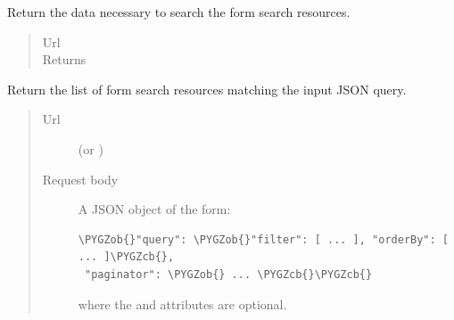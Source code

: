 \documentclass[letterpaper,10pt,english]{sphinxmanual}
\def\PYGZob{\char`\{}
\def\PYGZcb{\char`\}}
\begin{document}
\begin{fulllineitems}
\begin{fulllineitems}
\end{fulllineitems}


\begin{fulllineitems}
\label{api:onlinelinguisticdatabase.controllers.formsearches.FormsearchesController.new_search}
Return the data necessary to search the form search resources.
\begin{quote}\begin{description}
\item[{Url }] \leavevmode
{}

\item[{Returns}] \leavevmode
{}

\end{description}\end{quote}

\end{fulllineitems}


\begin{fulllineitems}
\label{api:onlinelinguisticdatabase.controllers.formsearches.FormsearchesController.search}
Return the list of form search resources matching the input JSON query.
\begin{quote}\begin{description}
\item[{Url }] \leavevmode
{} (or )

\item[{Request body}] \leavevmode
A JSON object of the form:

\begin{Verbatim}[commandchars=\\\{\}]
\PYGZob{}"query": \PYGZob{}"filter": [ ... ], "orderBy": [ ... ]\PYGZcb{},
 "paginator": \PYGZob{} ... \PYGZcb{}\PYGZcb{}
\end{Verbatim}

where the  and  attributes are optional.

\end{description}\end{quote}


\end{fulllineitems}
\end{fulllineitems}
\end{document}
